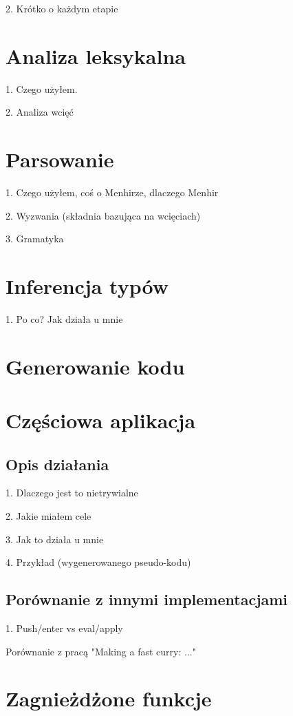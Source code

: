 \documentclass[declaration,shortabstract]{iithesis}
\begin{document}
2. Krótko o każdym etapie

\section{Analiza leksykalna}

1. Czego użyłem. 

2. Analiza wcięć 

\section{Parsowanie}

1. Czego użyłem, coś o Menhirze, dlaczego Menhir 

2. Wyzwania (składnia bazująca na wcięciach)

3. Gramatyka

\section{Inferencja typów}

1. Po co? Jak działa u mnie

\section{Generowanie kodu}
\section{Częściowa aplikacja}

\subsection{Opis działania}

1. Dlaczego jest to nietrywialne

2. Jakie miałem cele 

3. Jak to działa u mnie 

4. Przykład (wygenerowanego pseudo-kodu)

\subsection{Porównanie z innymi implementacjami}

1. Push/enter vs eval/apply

Porównanie z pracą "Making a fast curry: ..."

\section{Zagnieżdżone funkcje}
\end{document}
